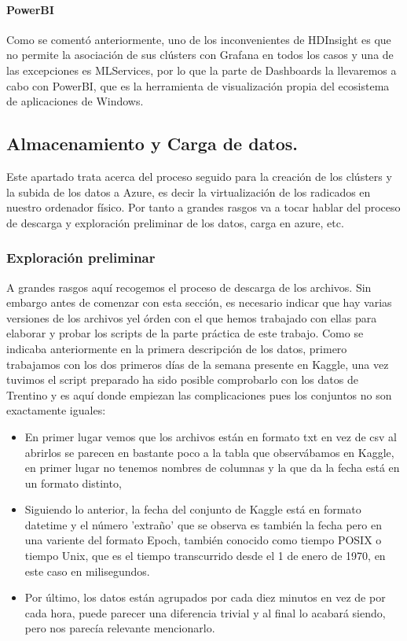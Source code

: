 \documentclass[11pt, a4paper]{article} %
\begin{document}
\paragraph{PowerBI}
Como se comentó anteriormente, uno de los inconvenientes de HDInsight es que no permite la asociación de sus clústers con Grafana en todos los casos y una de las excepciones es MLServices, por lo que la parte de Dashboards la llevaremos a cabo con PowerBI, que es la herramienta de visualización propia del ecosistema de aplicaciones de Windows.
\subsection{Almacenamiento y Carga de datos.}
Este apartado trata acerca del proceso seguido para la creación de los clústers y la subida de los datos a Azure, es decir la virtualización de los radicados en nuestro ordenador físico. Por tanto a grandes rasgos va a tocar hablar del proceso de descarga y exploración preliminar de los datos, carga en azure, etc.
\subsubsection{Exploración preliminar}
A grandes rasgos aquí recogemos el proceso de descarga de los archivos. Sin embargo antes de comenzar con esta sección, es necesario indicar que hay varias versiones de los archivos yel órden con el que hemos trabajado con ellas para elaborar y probar los scripts de la parte práctica de este trabajo. Como se indicaba anteriormente en la primera descripción de los datos, primero trabajamos con los dos primeros días de la semana presente en Kaggle, una vez tuvimos el script preparado ha sido posible comprobarlo con los datos de Trentino y es aquí donde empiezan las complicaciones pues los conjuntos no son exactamente iguales:
\begin{itemize}
\item En primer lugar vemos que los archivos están en formato txt en vez de csv al abrirlos se parecen en bastante poco a la tabla que observábamos en Kaggle, en primer lugar no tenemos nombres de columnas y la que da la fecha está en un formato distinto, 
\item Siguiendo lo anterior, la fecha del conjunto de Kaggle está en formato datetime y el número 'extraño' que se observa es también la fecha pero en una variente del formato Epoch, también conocido como tiempo POSIX o tiempo Unix, que es el tiempo transcurrido desde el 1 de enero de 1970, en este caso en milisegundos.
\item Por último, los datos están agrupados por cada diez minutos en vez de por cada hora, puede parecer una diferencia trivial y al final lo acabará siendo, pero nos parecía relevante mencionarlo.
\end{itemize}
\end{document}

